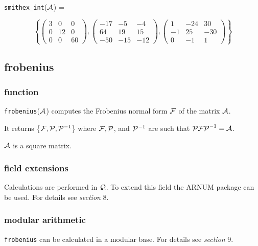 {\tt smithex\_int}(${\cal A}$) = 
\begin{center}
\begin{displaymath}
\left\{ \left( \begin{array}{ccc} 3 & 0 & 0 \\ 0 & 12 & 0 \\ 0 & 0 & 60 
\end{array} \right), \left( \begin{array}{ccc} -17 & -5 & -4 \\ 64 & 19 
& 15 \\ -50 & -15 & -12 \end{array} \right), \left( \begin{array}{ccc} 
1 & -24 & 30 \\ -1 & 25 & -30 \\ 0 & -1 & 1 \end{array} \right) \right\}
\end{displaymath}
\end{center}


\subsection{frobenius}

\subsubsection{function}

{\tt frobenius}(${\cal A}$) computes the Frobenius normal form 
${\cal F}$ of the matrix ${\cal A}$.

It returns \{${\cal F}, {\cal P}, {\cal P}^{-1}$\} where ${\cal F}, 
{\cal P}$, and ${\cal P}^{-1}$ are such that ${\cal P F P}^{-1} = 
{\cal A}$.

${\cal A}$ is a square matrix.

\subsubsection{field extensions}

Calculations are performed in ${\cal Q}$. To extend this field the 
{\small ARNUM} package can be used. For details see {\it section} 8.

\subsubsection{modular arithmetic}

{\tt frobenius} can be calculated in a modular base. For details see 
{\it section} 9.

